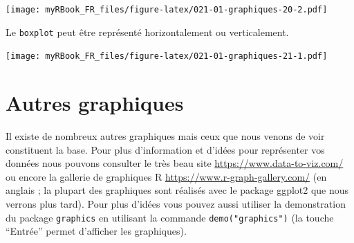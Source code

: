 \documentclass[]{book}
\newenvironment{Shaded}{\begin{snugshade}}{\end{snugshade}}
\newcommand{\DataTypeTok}[1]{\textcolor[rgb]{0.13,0.29,0.53}{#1}}
\newcommand{\DecValTok}[1]{\textcolor[rgb]{0.00,0.00,0.81}{#1}}
\newcommand{\KeywordTok}[1]{\textcolor[rgb]{0.13,0.29,0.53}{\textbf{#1}}}
\newcommand{\NormalTok}[1]{#1}
\newcommand{\OperatorTok}[1]{\textcolor[rgb]{0.81,0.36,0.00}{\textbf{#1}}}
\newcommand{\OtherTok}[1]{\textcolor[rgb]{0.56,0.35,0.01}{#1}}
\newcommand{\StringTok}[1]{\textcolor[rgb]{0.31,0.60,0.02}{#1}}
\begin{document}
\texttt{[image: myRBook\_FR\_files/figure-latex/021-01-graphiques-20-2.pdf]}

Le \texttt{boxplot} peut être représenté horizontalement ou verticalement.

\begin{Shaded}
\end{Shaded}

\texttt{[image: myRBook\_FR\_files/figure-latex/021-01-graphiques-21-1.pdf]}

\hypertarget{autres-graphiques}{%
\section{Autres graphiques}\label{autres-graphiques}}

Il existe de nombreux autres graphiques mais ceux que nous venons de voir constituent la base. Pour plus d'information et d'idées pour représenter vos données nous pouvons consulter le très beau site \url{https://www.data-to-viz.com/} ou encore la gallerie de graphiques R \url{https://www.r-graph-gallery.com/} (en anglais ; la plupart des graphiques sont réalisés avec le package ggplot2 que nous verrons plus tard). Pour plus d'idées vous pouvez aussi utiliser la demonstration du package \texttt{graphics} en utilisant la commande \texttt{demo("graphics")} (la touche ``Entrée'' permet d'afficher les graphiques).
\end{document}
